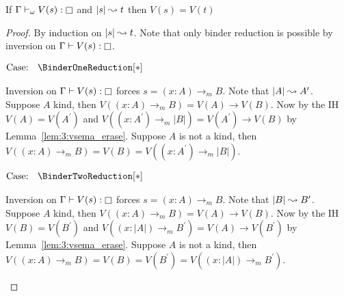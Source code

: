 \begin{lemma}
    \label{lem:3:vsema_erase_red_step}
    If $\Gamma \vdash_\omega V(s) : \kind$ and $|s| \leadsto t$ then $V(s) = V(t)$
\end{lemma}
\begin{proof}
    By induction on $|s| \leadsto t$.
    Note that only binder reduction is possible by inversion on $\Gamma \vdash V(s) : \kind$.

    $\text{Case: }\begin{array}{c} \BinderOneReduction[*] \end{array}$
    \begin{proofcase}
        Inversion on $\Gamma \vdash V(s) : \kind$ forces $s = (x : A) \to_m B$.
        Note that $|A| \leadsto A^\prime$.
        Suppose $A$ kind, then $V((x : A) \to_m B) = V(A) \to V(B)$.
        Now by the IH $V(A) = V(A^\prime)$ and $V((x : A^\prime) \to_m |B|) = V(A^\prime) \to V(B)$ by Lemma~\ref{lem:3:vsema_erase}.
        Suppose $A$ is not a kind, then $V((x : A) \to_m B) = V(B) = V((x : A^\prime) \to_m |B|)$.
    \end{proofcase}

    $\text{Case: }\begin{array}{c} \BinderTwoReduction[*] \end{array}$
    \begin{proofcase}
        Inversion on $\Gamma \vdash V(s) : \kind$ forces $s = (x : A) \to_m B$.
        Note that $|B| \leadsto B^\prime$.
        Suppose $A$ kind, then $V((x : A) \to_m B) = V(A) \to V(B)$.
        Now by the IH $V(B) = V(B^\prime)$ and $V((x : |A|) \to_m B^\prime) = V(A) \to V(B^\prime)$ by Lemma~\ref{lem:3:vsema_erase}.
        Suppose $A$ is not a kind, then $V((x : A) \to_m B) = V(B) = V(B^\prime) = V((x : |A|) \to_m B^\prime)$.
    \end{proofcase}
\end{proof}

